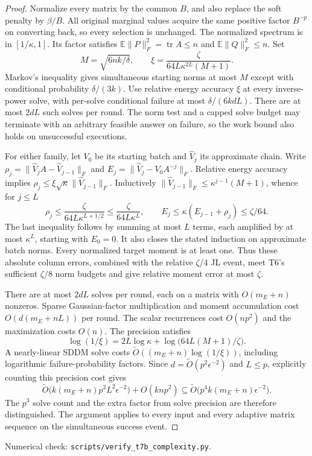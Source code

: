 \documentclass[11pt]{article}
\DeclareMathOperator{\tr}{tr}
\newcommand{\E}{\mathbb E}
\begin{document}
\begin{proof}
Normalize every matrix by the common $B$, and also replace the
soft penalty by $\beta/B$. All original marginal values acquire
the same positive factor $B^{-p}$ on converting back, so every
selection is unchanged. The normalized spectrum is in
$[1/\kappa,1]$. Its factor satisfies
$\E\|P\|_F^2=\tr A\leq n$ and $\E\|Q\|_F^2\leq n$.
Set
\begin{equation}\label{eq:freshprecision}
 M=\sqrt{6nk/\delta},\qquad
 \xi=\frac{\zeta}{64L\kappa^{2L}(M+1)}.
\end{equation}
Markov's inequality gives simultaneous starting norms at most $M$
except with conditional probability $\delta/(3k)$. Use relative
energy accuracy $\xi$ at every inverse-power solve, with per-solve
conditional failure at most $\delta/(6kdL)$. There are at most
$2dL$ such solves per round. The norm test and a capped solve budget
may terminate with an arbitrary feasible answer on failure, so the
work bound also holds on unsuccessful executions.

For either family, let $V_0$ be its starting batch and $\widehat V_j$
its approximate chain. Write $\rho_j=\|\widehat V_j A-
\widehat V_{j-1}\|_F$ and
$E_j=\|\widehat V_j-V_0A^{-j}\|_F$. Relative energy accuracy
implies $\rho_j\leq\xi\sqrt\kappa\|\widehat V_{j-1}\|_F$.
Inductively $\|\widehat V_{j-1}\|_F\leq
\kappa^{j-1}(M+1)$, whence for $j\leq L$
\[
 \rho_j\leq\frac{\zeta}{64L\kappa^{L+1/2}}
 \leq\frac{\zeta}{64L\kappa^L},\qquad
 E_j\leq\kappa(E_{j-1}+\rho_j)\leq\zeta/64.
\]
The last inequality follows by summing at most $L$ terms, each
amplified by at most $\kappa^L$, starting with $E_0=0$.
It also closes the stated induction on approximate batch norms.
Every normalized target moment is at least one. Thus these
absolute column errors, combined with the relative $\zeta/4$
JL event, meet T6's sufficient $\zeta/8$ norm budgets and give
relative moment error at most $\zeta$.

There are at most $2dL$ solves per round, each on a matrix with
$O(m_E+n)$ nonzeros. Sparse Gaussian-factor multiplication and
moment accumulation cost $O(d(m_E+nL))$ per round. The scalar
recurrences cost $O(np^2)$ and the maximization costs $O(n)$.
The precision satisfies
\[
 \log(1/\xi)=2L\log\kappa+
       \log\bigl(64L(M+1)/\zeta\bigr).
\]
A nearly-linear SDDM solve costs
$\widetilde O((m_E+n)\log(1/\xi))$, including logarithmic
failure-probability factors. Since $d=\widetilde O(p^2\epsilon^{-2})$
and $L\leq p$, explicitly counting this precision cost gives
\[
 \widetilde O\bigl(k(m_E+n)p^2L^2\epsilon^{-2}\bigr)
       +O(knp^2)
 \subseteq\widetilde O\bigl(p^4k(m_E+n)\epsilon^{-2}\bigr).
\]
The $p^3$ solve count and the extra factor from solve precision are
therefore distinguished. The argument applies to every input and
every adaptive matrix sequence on the simultaneous success event.
\end{proof}
\noindent Numerical check: \texttt{scripts/verify\_t7b\_complexity.py}.
\end{document}
